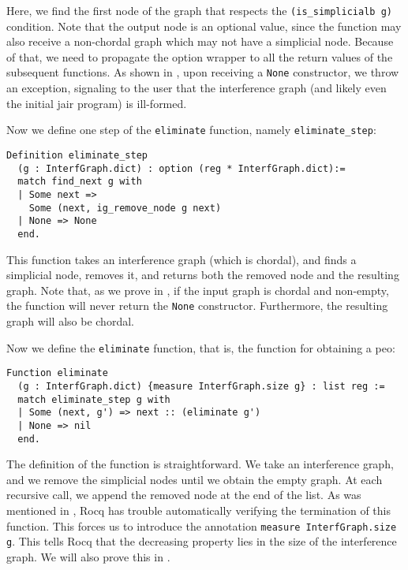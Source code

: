 Here, we find the first node of the graph that respects the \texttt{(is\_simplicialb g)} condition. Note that the output node is an optional value, since the function may also receive a non-chordal graph which may not have a simplicial node. Because of that, we need to propagate the option wrapper to all the return values of the subsequent functions.
As shown in , upon receiving a \texttt{None} constructor, we throw an exception, signaling to the user that the interference graph (and likely even the initial \gls{jair} program) is ill-formed.

Now we define one step of the \texttt{eliminate} function, namely \texttt{eliminate\_step}:

\begin{lstlisting}[style=Rocq]
Definition eliminate_step
  (g : InterfGraph.dict) : option (reg * InterfGraph.dict):=
  match find_next g with
  | Some next =>
    Some (next, ig_remove_node g next)
  | None => None
  end.
\end{lstlisting}

This function takes an interference graph (which is chordal), and finds a simplicial node, removes it, and returns both the removed node and the resulting graph.
Note that, as we prove in , if the input graph is chordal and non-empty, the function will never return the \texttt{None} constructor. Furthermore, the resulting graph will also be chordal.

Now we define the \texttt{eliminate} function, that is, the function for obtaining a \gls{peo}:

\begin{lstlisting}[style=Rocq]
Function eliminate
  (g : InterfGraph.dict) {measure InterfGraph.size g} : list reg :=
  match eliminate_step g with
  | Some (next, g') => next :: (eliminate g')
  | None => nil
  end.
\end{lstlisting}

The definition of the function is straightforward. We take an interference graph, and we remove the simplicial nodes until we obtain the empty graph. At each recursive call, we append the removed node at the end of the list.
As was mentioned in , Rocq has trouble automatically verifying the termination of this function. This forces us to introduce the annotation \texttt{{measure InterfGraph.size g}}. This tells Rocq that the decreasing property lies in the size of the interference graph. We will also prove this in .

